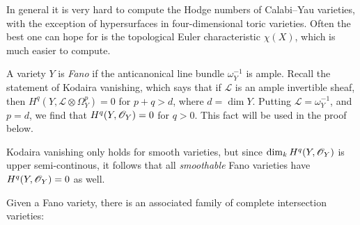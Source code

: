 In general it is very hard to compute the Hodge numbers of Calabi--Yau varieties, with the exception of hypersurfaces in four-dimensional toric varieties. Often the best one can hope for is the topological Euler characteristic $\chi(X)$, which is much easier to compute.

A variety $Y$ is \emph{Fano} if the anticanonical line bundle $\omega_Y^{-1}$ is ample. Recall the statement of Kodaira vanishing, which says that if $\mathscr L$ is an ample invertible sheaf, then $H^q(Y,\mathscr L \otimes \Omega_Y^p)=0$ for $p+q>d$, where $d=\dim Y$. Putting $\mathscr L=\omega_Y^{-1}$, and $p=d$, we find that $H^q(Y,\mathscr{O}_Y)=0$ for $q > 0$. This fact will be used in the proof below.

\begin{remark}
Kodaira vanishing only holds for smooth varieties, but since $\dim_k H^q(Y,\mathscr{O}_Y)$ is upper semi-continous, it follows that all \emph{smoothable} Fano varieties have $H^q(Y,\mathscr{O}_Y)=0$ as well.
\end{remark}


Given a Fano variety, there is an associated family of complete intersection \CY varieties:

